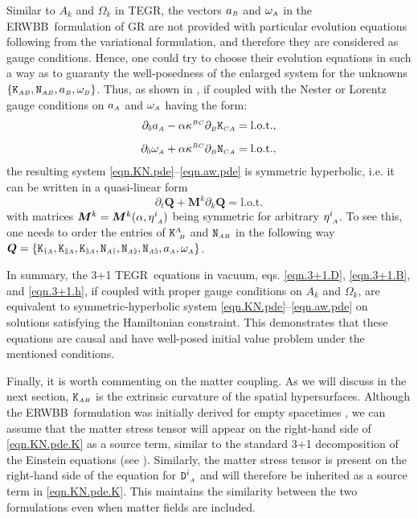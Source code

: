 \documentclass[
10pt, %
a4paper, %
oneside, %
twocolumn,
headinclude,footinclude, %
BCOR5mm, %
]{scrartcl}
\newcommand{\ERWBB}{{ERWBB}}
\newcommand{\sA}{\mathsmaller A}
\newcommand{\sB}{\mathsmaller B}
\newcommand{\sC}{\mathsmaller C}
\newcommand{\pd}[1]{\partial_{#1}}
\newcommand{\MG}[1]{\kappa^{#1}}			%
\newcommand{\itetrsymbol}{\eta}
\newcommand{\itetr}[2]{\itetrsymbol^{#1}_{\phantom{#1}#2}}
\newcommand{\Dfin}[2]{\mathtt{D}_{\phantom{#2}#1}^{#2}}	%
\newcommand{\Kbuch}[2]{\mathtt{K}_{{#1}{#2}}}	%
\newcommand{\Nbuchdown}[2]{\mathtt{N}_{#1#2}}	%
\newcommand{\Kbuchmix}[2]{\mathtt{K}^{#1}_{\ #2}}	%
\newcommand{\tegr}{TEGR}
\newcommand{\indalg}[1]{\hat{\mathsmaller{#1}}}
\begin{document}
	Similar to $ A_k $ and $ \Omega_k $ in TEGR, the vectors $ a_{\sB} $ and $
	\omega_{\sA} $ in the \ERWBB\ formulation of GR are not provided with
	particular evolution equations following from the variational formulation,
	and therefore they are considered as gauge conditions. Hence, one could try
	to choose their evolution equations in such a way as to guaranty the
	well-posedness of the enlarged system for the unknowns $
	\{\Kbuch{\sA}{\sB},\Nbuchdown{\sA}{\sB},a_\sB,\omega_\sB \}$. Thus, as shown
	in \cite{Estabrook1997,Buchman2003}, if coupled with the Nester or Lorentz
	gauge conditions on $a_\sA$ and $\omega_\sA$ having the form:
	\begin{subequations}\label{eqn.aw.pde}
		\begin{align}
			\pd{\indalg{0}} a_\sA - \alpha \MG{\sB\sC}\pd{\sB} \Kbuch{\sC}{\sA} &= \text{l.o.t.},
			\\[2mm]
			\pd{\indalg{0}} \omega_\sA + \alpha \MG{\sB\sC}\pd{\sB} \Nbuchdown{\sC}{\sA} &= \text{l.o.t.},
		\end{align}
	\end{subequations}
	the resulting system \eqref{eqn.KN.pde}--\eqref{eqn.aw.pde} is symmetric
	hyperbolic, i.e. it can be written in a quasi-linear form
	\begin{equation}\label{eqn.quasi.lin}
		\pd{t} \bm{Q} + \bm{M}^k\pd{k} \bm{Q} = \text{l.o.t.}
	\end{equation}
	with matrices $ \bm{M}^k = \bm{M}^k(\alpha,\itetr{i}{\sA})$ being symmetric for arbitrary $\itetr{i}{\sA}$.
	To see this, one needs to order the entries of
	$\Kbuchmix{\sA}{\sB}$ and $\Nbuchdown{\sA}{\sB}$ in the following way
	$\bm{Q} = \{\Kbuch{\indalg{1}}{\sA},\Kbuch{\indalg{2}}{\sA},\Kbuch{\indalg{3}}{\sA},\Nbuchdown{\sA}{\indalg{1}},\Nbuchdown{\sA}{\indalg{2}},\Nbuchdown{\sA}{\indalg{3}},a_\sA,\omega_\sA\}$.
	
	In summary, the 3+1 \tegr\ equations in vacuum, eqs. \eqref{eqn.3+1.D},
	\eqref{eqn.3+1.B}, and \eqref{eqn.3+1.h}, if coupled with proper gauge
	conditions on $A_k$ and $\Omega_k$, are equivalent to symmetric-hyperbolic
	system \eqref{eqn.KN.pde}--\eqref{eqn.aw.pde} on solutions satisfying the
	Hamiltonian constraint. This demonstrates that these equations are causal
	and have well-posed initial value problem under the mentioned conditions.

	Finally, it is worth commenting on the matter coupling. As we will
	discuss in the next section, $\Kbuch{\sA}{\sB}$ is the extrinsic curvature
	of the spatial hypersurfaces. Although the \ERWBB\ formulation was initially
	derived for empty spacetimes \cite{Estabrook1997,Buchman2003}, we can assume
	that the matter stress tensor will appear on the right-hand side of
	\eqref{eqn.KN.pde.K} as a source term, similar to the standard 3+1
	decomposition of the Einstein equations (see
	\cite[eq.(5.19)]{Gourgoulhon2012a}). Similarly, the matter stress tensor is
	present on the right-hand side of the equation for $\Dfin{\sA}{i}$ and will
	therefore be inherited as a source term in \eqref{eqn.KN.pde.K}. This
	maintains the similarity between the two formulations even when matter
	fields are included.
	
\end{document}
